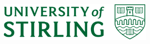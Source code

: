 \begin{titlepage}
		
		
		\vfill
		\includegraphics[height=20mm]{Images/unilogo.png}
		
		
		\vfill %
		
	\end{titlepage}